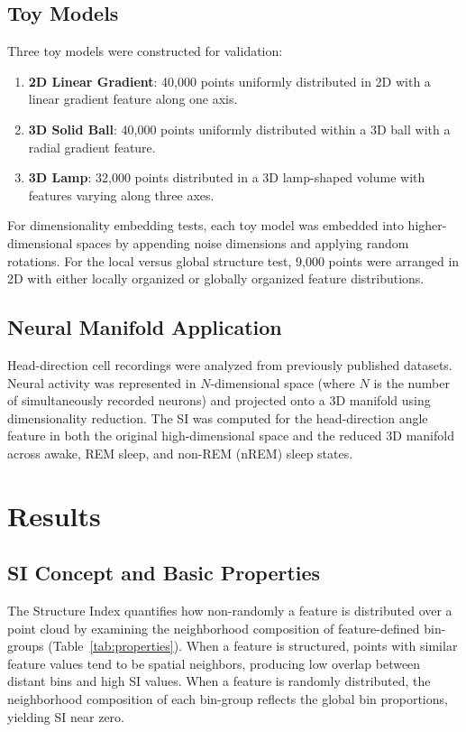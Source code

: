 \documentclass[12pt]{article}
\begin{document}
\subsection{Toy Models}

Three toy models were constructed for validation:
\begin{enumerate}
\item \textbf{2D Linear Gradient}: 40,000 points uniformly distributed in 2D with a linear gradient feature along one axis.
\item \textbf{3D Solid Ball}: 40,000 points uniformly distributed within a 3D ball with a radial gradient feature.
\item \textbf{3D Lamp}: 32,000 points distributed in a 3D lamp-shaped volume with features varying along three axes.
\end{enumerate}

For dimensionality embedding tests, each toy model was embedded into higher-dimensional spaces by appending noise dimensions and applying random rotations. For the local versus global structure test, 9,000 points were arranged in 2D with either locally organized or globally organized feature distributions.

\subsection{Neural Manifold Application}

Head-direction cell recordings were analyzed from previously published datasets. Neural activity was represented in $N$-dimensional space (where $N$ is the number of simultaneously recorded neurons) and projected onto a 3D manifold using dimensionality reduction. The SI was computed for the head-direction angle feature in both the original high-dimensional space and the reduced 3D manifold across awake, REM sleep, and non-REM (nREM) sleep states.

\section{Results}

\subsection{SI Concept and Basic Properties}

The Structure Index quantifies how non-randomly a feature is distributed over a point cloud by examining the neighborhood composition of feature-defined bin-groups (Table~\ref{tab:properties}). When a feature is structured, points with similar feature values tend to be spatial neighbors, producing low overlap between distant bins and high SI values. When a feature is randomly distributed, the neighborhood composition of each bin-group reflects the global bin proportions, yielding SI near zero.
\end{document}
